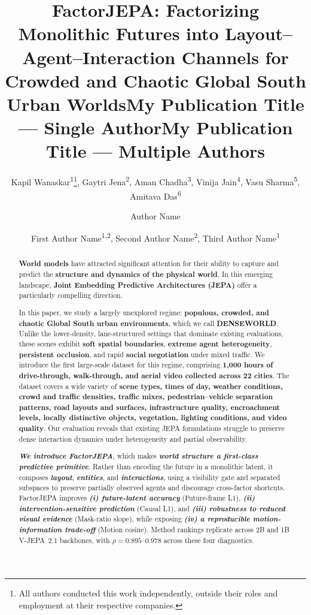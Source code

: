 \documentclass[letterpaper]{article} %
\title{FactorJEPA: Factorizing Monolithic Futures into Layout–Agent–Interaction Channels for Crowded and Chaotic Global South Urban Worlds}
\author{
    Kapil Wanaskar\textsuperscript{\rm 1}\thanks{All authors conducted this work independently, outside their roles and employment at their respective companies.},
    Gaytri Jena\textsuperscript{\rm 2},
    Aman Chadha\textsuperscript{\rm 3},
    Vini{}ja Jain\textsuperscript{\rm 4},  %
    Vasu Sharma\textsuperscript{\rm 5},
    Amitava Das\textsuperscript{\rm 6}
}
\title{My Publication Title --- Single Author}
\author {
    Author Name
}
\title{My Publication Title --- Multiple Authors}
\author {
    First Author Name\textsuperscript{\rm 1,\rm 2}\equalcontrib,
    Second Author Name\textsuperscript{\rm 2}\equalcontrib,
    Third Author Name\textsuperscript{\rm 1}\corresponding
}
\begin{document}
\maketitle

\begin{abstract}


\textbf{World models} have attracted significant attention for their ability to capture and predict the \textbf{structure and dynamics of the physical world}. In this emerging landscape, \textbf{Joint Embedding Predictive Architectures (JEPA)} offer a particularly compelling direction. 

In this paper, we study a largely unexplored regime: \textbf{populous, crowded, and chaotic Global South urban environments}, which we call \textbf{DENSEWORLD}. Unlike the lower-density, lane-structured settings that dominate existing evaluations, these scenes exhibit \textbf{soft spatial boundaries}, \textbf{extreme agent heterogeneity}, \textbf{persistent occlusion}, and rapid \textbf{social negotiation} under mixed traffic. We introduce the first large-scale dataset for this regime, comprising \textbf{1,000 hours of drive-through, walk-through, and aerial video collected across 22 cities}. The dataset covers a wide variety of \textbf{scene types, times of day, weather conditions, crowd and traffic densities, traffic mixes, pedestrian--vehicle separation patterns, road layouts and surfaces, infrastructure quality, encroachment levels, locally distinctive objects, vegetation, lighting conditions, and video quality}. Our evaluation reveals that existing JEPA formulations struggle to preserve dense interaction dynamics under heterogeneity and partial observability.

\textbf{\emph{We introduce FactorJEPA}}, which makes \textbf{\emph{world structure a first-class predictive primitive}}. Rather than encoding the future in a monolithic latent, it composes \textbf{\emph{layout}}, \textbf{\emph{entities}}, and \textbf{\emph{interactions}}, using a visibility gate and separated subspaces to preserve partially observed agents and discourage cross-factor shortcuts. FactorJEPA improves \textbf{\emph{(i) future-latent accuracy}} (Future-frame L1), \textbf{\emph{(ii) intervention-sensitive prediction}} (Causal L1), and \textbf{\emph{(iii) robustness to reduced visual evidence}} (Mask-ratio slope), while exposing \textbf{\emph{(iv) a reproducible motion-information trade-off}} (Motion cosine). Method rankings replicate across 2B and 1B V-JEPA~2.1 backbones, with $\rho=0.895$--$0.978$ across these four diagnostics.


\end{abstract}
\end{document}
